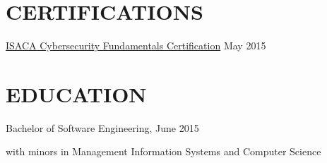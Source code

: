 \documentclass[]{dylan-resume}
\begin{document}
\begin{minipage}[t]{1.00\textwidth}

\section{CERTIFICATIONS}
\vspace{\topsep} %
\begin{tightemize}
\item \href{https://cybersecurity.isaca.org/csx-certifications/csx-fundamentals-certificate}{ISACA Cybersecurity Fundamentals Certification} \hspace*{\fill}May 2015
\end{tightemize}
\sectionsep

\section{EDUCATION}
\href{http://behrend.psu.edu/}{}
\hspace*{\fill} \href{http://www.erie.pa.us/}{}
\begin{tightemize}
\item Bachelor of Software Engineering, \hspace*{\fill}June 2015 \par with minors in Management Information Systems and Computer Science
\end{tightemize}
\sectionsep

\end{minipage}
\end{document}
